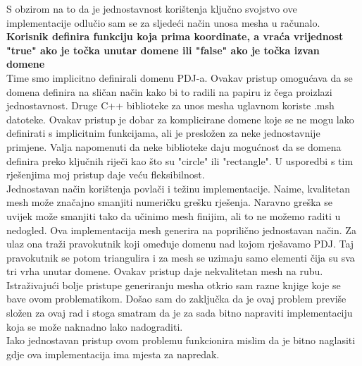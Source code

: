 \documentclass[zavrsnirad]{../fer}
\begin{document}
S obzirom na to da
je jednostavnost korištenja ključno svojstvo ove implementacije 
odlučio sam se za sljedeći način unosa mesha u računalo.
\bigskip
\\ 
\textbf{Korisnik definira funkciju koja prima koordinate, a
vraća vrijednost "true" ako je točka unutar domene ili
"false" ako je točka izvan domene}
\bigskip
\\ 
Time smo implicitno definirali domenu PDJ-a.
Ovakav pristup omogućava da se domena definira na sličan 
način kako bi to radili na papiru iz čega proizlazi jednostavnost.
Druge C++ biblioteke za unos mesha uglavnom koriste .msh datoteke.
Ovakav pristup je dobar za komplicirane domene koje se ne mogu
lako definirati s implicitnim funkcijama, ali je presložen za neke
jednostavnije primjene. Valja napomenuti da neke biblioteke 
daju mogućnost da se domena definira preko ključnih riječi kao 
što su "circle" ili "rectangle". U usporedbi s tim rješenjima 
moj pristup daje veću fleksibilnost.
\bigskip
\\ 
Jednostavan način korištenja povlači i težinu implementacije.
Naime, kvalitetan mesh može značajno smanjiti numeričku grešku
rješenja. Naravno greška se uvijek može smanjiti tako da 
učinimo mesh finijim, ali to ne možemo raditi u nedogled.
Ova implementacija mesh generira na poprilično jednostavan način.
Za ulaz ona traži pravokutnik koji omeđuje domenu nad kojom
rješavamo PDJ. Taj pravokutnik se potom triangulira i za mesh
se uzimaju samo elementi čija su sva tri vrha unutar domene.
Ovakav pristup daje nekvalitetan mesh na rubu. Istraživajući
bolje pristupe generiranju mesha otkrio sam razne knjige koje
se bave ovom problematikom. Došao sam do zaključka da 
je ovaj problem previše složen za ovaj rad i stoga smatram da
je za sada bitno napraviti implementaciju koja se može naknadno lako 
nadograditi.
\\
Iako jednostavan pristup ovom problemu funkcionira
mislim da je bitno naglasiti gdje ova implementacija ima
mjesta za napredak.
\end{document}
